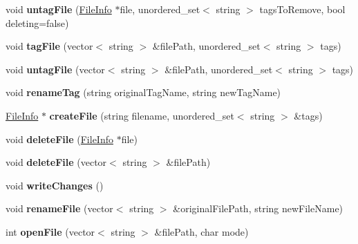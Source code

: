 \begin{DoxyCompactItemize}
void {\bfseries untag\+File} (\mbox{\hyperlink{classFileInfo}{File\+Info}} $\ast$file, unordered\+\_\+set$<$ string $>$ tags\+To\+Remove, bool deleting=false)
\item 
\mbox{\label{classFileSystem_a93a4194b1f12fb81f9816be51d1bdfa7}} 
void {\bfseries tag\+File} (vector$<$ string $>$ \&file\+Path, unordered\+\_\+set$<$ string $>$ tags)
\item 
\mbox{\label{classFileSystem_aea4ea7f9e9910c3b6bdf153a8f801eb8}} 
void {\bfseries untag\+File} (vector$<$ string $>$ \&file\+Path, unordered\+\_\+set$<$ string $>$ tags)
\item 
\mbox{\label{classFileSystem_ad4a7152f3ef95780b0ee5d907a526bdc}} 
void {\bfseries rename\+Tag} (string original\+Tag\+Name, string new\+Tag\+Name)
\item 
\mbox{\label{classFileSystem_a345e38c71ac44fb898a86f7fe6fd5b8b}} 
\mbox{\hyperlink{classFileInfo}{File\+Info}} $\ast$ {\bfseries create\+File} (string filename, unordered\+\_\+set$<$ string $>$ \&tags)
\item 
\mbox{\label{classFileSystem_a09faf11ddeba6c8df97971fef765faa6}} 
void {\bfseries delete\+File} (\mbox{\hyperlink{classFileInfo}{File\+Info}} $\ast$file)
\item 
\mbox{\label{classFileSystem_ad311df477641088bdd2c7b12474d5887}} 
void {\bfseries delete\+File} (vector$<$ string $>$ \&file\+Path)
\item 
\mbox{\label{classFileSystem_a29e11a70216913489dc7231fc676c2b9}} 
void {\bfseries write\+Changes} ()
\item 
\mbox{\label{classFileSystem_a3af47649f3cb88b9b36282a3c2feea41}} 
void {\bfseries rename\+File} (vector$<$ string $>$ \&original\+File\+Path, string new\+File\+Name)
\item 
\mbox{\label{classFileSystem_ad074d316d2f5eabf3540e02f467536d2}} 
int {\bfseries open\+File} (vector$<$ string $>$ \&file\+Path, char mode)
\item 
\mbox{\label{classFileSystem_abe55cad8f243127218c4fd2229269186}} 

\end{DoxyCompactItemize}
